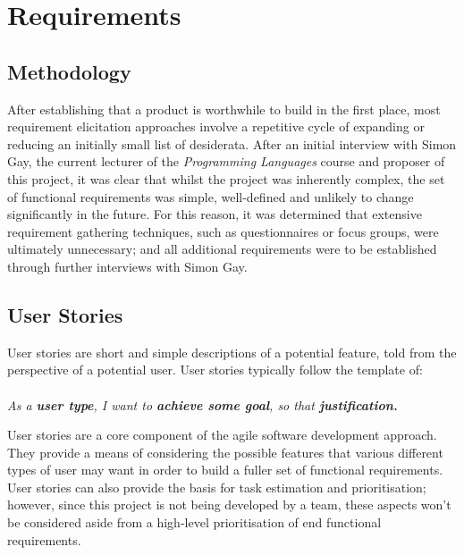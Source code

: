 \documentclass{l4proj}
\begin{document}
\chapter{Requirements}
\section{Methodology} 
After establishing that a product is worthwhile to build in the first place, most requirement elicitation approaches involve a repetitive cycle of expanding or reducing an initially small list of desiderata. After an initial interview with Simon Gay, the current lecturer of the {\it Programming Languages} course and proposer of this project, it was clear that whilst the project was inherently complex, the set of functional requirements was simple, well-defined and unlikely to change significantly in the future. For this reason, it was determined that extensive requirement gathering techniques, such as questionnaires or focus groups, were ultimately unnecessary; and all additional requirements were to be established through further interviews with Simon Gay.

\section{User Stories}
User stories are short and simple descriptions of a potential feature, told from the perspective of a potential user. User stories typically follow the template of:\\\\
\textit{As a \textbf{user type}, I want to \textbf{achieve some goal}, so that \textbf{justification.}}

User stories are a core component of the agile software development approach. They provide a means of considering the possible features that various different types of user may want in order to build a fuller set of functional requirements. User stories can also provide the basis for task estimation and prioritisation; however, since this project is not being developed by a team, these aspects won't be considered aside from a high-level prioritisation of end functional requirements.
\end{document}

